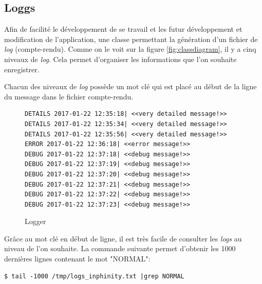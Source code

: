 \subsection{Loggs}
Afin de facilité le développement de se travail et les futur développement et modification de l'application, une classe permettant la génération d'un fichier de \emph{log} (compte-rendu). Comme on le voit sur la figure \ref{fig:classdiagram}, il y a cinq niveaux de \emph{log}. Cela permet d'organiser les informations que l'on souhaite enregistrer.

Chacun des niveaux de \emph{log} possède un mot clé qui est placé au début de la ligne du message dans le fichier compte-rendu.

\lstset{language=bash}

\begin{figure}[H] 
\centering 
\begin{lstlisting}[frame=single]
DETAILS 2017-01-22 12:35:18| <<very detailed message!>>
DETAILS 2017-01-22 12:35:34| <<very detailed message!>>
DETAILS 2017-01-22 12:35:56| <<very detailed message!>>
ERROR 2017-01-22 12:36:18| <<error message!>>
DEBUG 2017-01-22 12:37:18| <<debug message!>>
DEBUG 2017-01-22 12:37:19| <<debug message!>>
DEBUG 2017-01-22 12:37:20| <<debug message!>>
DEBUG 2017-01-22 12:37:21| <<debug message!>>
DEBUG 2017-01-22 12:37:22| <<debug message!>>
DEBUG 2017-01-22 12:37:23| <<debug message!>>
\end{lstlisting}
\caption[Logger]{Logger}
\label{fig:logger} 
\end{figure}

Grâce au mot clé en début de ligne, il est très facile de consulter les \emph{logs} au niveau de l'on souhaite. La commande suivante permet d'obtenir les 1000 dernières lignes contenant le mot "NORMAL":

\begin{lstlisting}[frame=single]
$ tail -1000 /tmp/logs_inphinity.txt |grep NORMAL
\end{lstlisting}














































